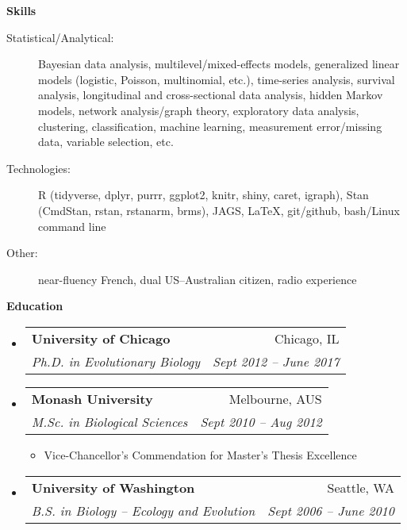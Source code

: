 \documentclass[letterpaper,11pt]{article}
\makeatletter
\newcommand{\resheading}[1]{{\large \colorbox{mygrey}{\begin{minipage}{\textwidth}{\textbf{#1 \vphantom{p\^{E}}}}\end{minipage}}}}
\newcommand{\ressubheading}[4]{
  \begin{tabular*}{6.5in}{l@{\extracolsep{\fill}}r}
    \textbf{#1} & #2 \\
    \textit{#3} & \textit{#4} \\
\end{tabular*}\vspace{-6pt}}
\makeatother
\begin{document}

%

\vspace{0.25in}
\resheading{Skills}
\begin{description}
  \item[Statistical/Analytical:] { \footnotesize Bayesian data analysis, multilevel/mixed-effects models, generalized linear models (logistic, Poisson, multinomial, etc.), time-series analysis, survival analysis, longitudinal and cross-sectional data analysis, hidden Markov models, network analysis/graph theory, exploratory data analysis, clustering, classification, machine learning, measurement error/missing data, variable selection, etc. }
  \item[Technologies:] { \footnotesize R (tidyverse, dplyr, purrr, ggplot2, knitr, shiny, caret, igraph), Stan (CmdStan, rstan, rstanarm, brms), JAGS, \LaTeX, git/github, bash/Linux command line }
  \item[Other:] { \footnotesize near-fluency French, dual US--Australian citizen, radio experience }
\end{description} %
\vspace{0.25in}


\resheading{Education}
\begin{itemize}
  \item
    \ressubheading{University of Chicago}{Chicago, IL}{Ph.D. in Evolutionary Biology}{Sept 2012 -- June 2017}
  \item
    \ressubheading{Monash University}{Melbourne, AUS}{M.Sc. in Biological Sciences}{Sept 2010 -- Aug 2012}
    \begin{itemize}
      \item Vice-Chancellor's Commendation for Master's Thesis Excellence
    \end{itemize}
  \item
    \ressubheading{University of Washington}{Seattle, WA}{B.S. in Biology -- Ecology and Evolution}{Sept 2006 -- June 2010}
\end{itemize} %



\end{document}
